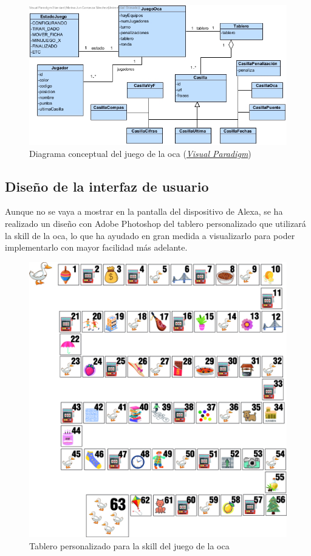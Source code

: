 \vline
\begin{figure}[H]
	\centering
	\includegraphics[width=1\textwidth]{imgs/DConcep.jpg}
	\caption{Diagrama conceptual del juego de la oca (\href{https://www.visual-paradigm.com/}{\textit{Visual Paradigm}})}
	\label{fig:DConcep-1}
\end{figure}

\subsection{Diseño de la interfaz de usuario}

Aunque no se vaya a mostrar en la pantalla del dispositivo de Alexa, se ha realizado un diseño con Adobe Photoshop del tablero personalizado que utilizará la skill de la oca, lo que ha ayudado en gran medida a visualizarlo para poder implementarlo con mayor facilidad más adelante.

\begin{figure}[H]
	\centering
	\includegraphics[width=1\textwidth]{imgs/tablero-oca.jpg}
	\caption{Tablero personalizado para la skill del juego de la oca}
	\label{fig:tablero-oca}
\end{figure}
 
